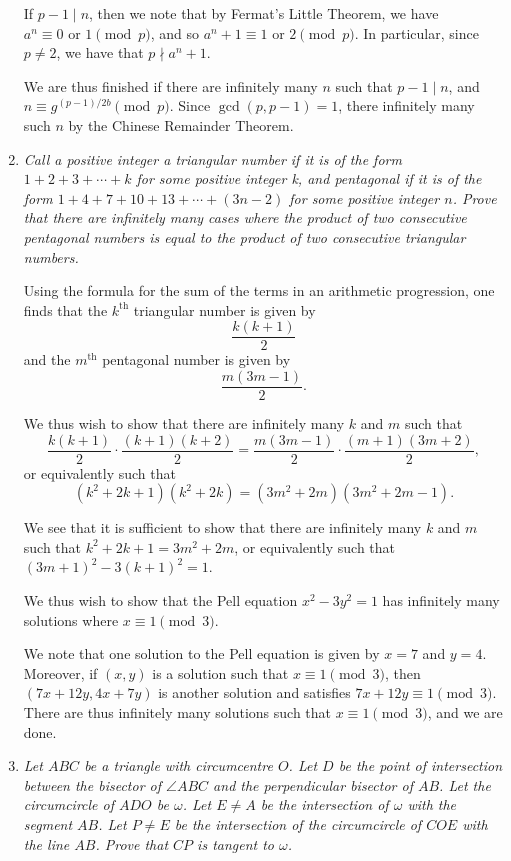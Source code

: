 \documentclass{article}
\begin{document}
\begin{enumerate}[1.]
If $p - 1 \mid n$, then we note that by Fermat's Little Theorem, we have $a^n \equiv 0 \text{ or } 1 \pmod p$, and so $a^n + 1 \equiv 1 \text{ or } 2 \pmod p$. In particular, since $p \neq 2$, we have that $p \nmid a^n + 1$. 

We are thus finished if there are infinitely many $n$ such that $p - 1 \mid n$, and $n \equiv g^{(p - 1)/2b} \pmod p$. Since $\gcd(p, p - 1) = 1$, there infinitely many such $n$ by the Chinese Remainder Theorem.

\vspace{6pt}
\item %
{\itshape Call a positive integer a \emph{triangular} number if it is of the form $1 +2 +3 +\dotsb +k$ for some positive integer k, and \emph{pentagonal} if it is of the form $1 +4 +7 +10 +13 +\dotsb +(3n-2)$ for some positive integer $n$. Prove that there are infinitely many cases where the product of two consecutive pentagonal numbers is equal to the product of two consecutive triangular numbers.}

Using the formula for the sum of the terms in an arithmetic progression, one finds that the $k^\text{th}$ triangular number is given by
\[
	\frac{k(k + 1)}{2}
\]
and the $m^\text{th}$ pentagonal number is given by
\[
	\frac{m(3m - 1)}{2}.
\]

We thus wish to show that there are infinitely many $k$ and $m$ such that
\[
	\frac{k(k + 1)}{2} \cdot \frac{(k + 1)(k + 2)}{2} = \frac{m(3m - 1)}{2} \cdot \frac{(m + 1)(3m + 2)}{2},
\]
or equivalently such that
\[
	(k^2 + 2k + 1)(k^2 + 2k) = (3m^2 + 2m)(3m^2 + 2m - 1).
\]

We see that it is sufficient to show that there are infinitely many $k$ and $m$ such that $k^2 + 2k + 1 = 3m^2 + 2m$, or equivalently such that ${(3m + 1)}^2 - 3{(k + 1)}^2 = 1$.

We thus wish to show that the Pell equation $x^2 - 3y^2 = 1$ has infinitely many solutions where $x \equiv 1 \pmod 3$.

We note that one solution to the Pell equation is given by $x = 7$ and $y = 4$. Moreover, if $(x, y)$ is a solution such that $x \equiv 1 \pmod 3$, then $(7x + 12y, 4x + 7y)$ is another solution and satisfies $7x + 12y \equiv 1 \pmod 3$. There are thus infinitely many solutions such that $x \equiv 1 \pmod 3$, and we are done.

\vspace{6pt}
\item %
{\itshape Let $ABC$ be a triangle with circumcentre $O$. Let $D$ be the point of intersection between the bisector of $\angle ABC$ and the perpendicular bisector of $AB$. Let the circumcircle of $ADO$ be $\omega$. Let $E\neq A$ be the intersection of $\omega$ with the segment $AB$. Let $P\neq E$ be the intersection of the circumcircle of $COE$ with the line $AB$. Prove that $CP$ is tangent to $\omega$.}


\end{enumerate}
\end{document}
